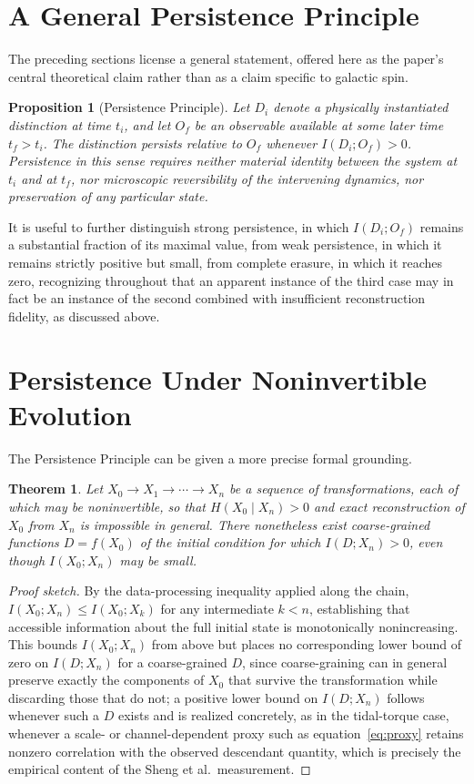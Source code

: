 \documentclass[11pt]{article}
\newtheorem{theorem}{Theorem}
\newtheorem{proposition}{Proposition}
\begin{document}
\section{A General Persistence Principle}

The preceding sections license a general statement, offered here as the paper's central theoretical claim rather than as a claim specific to galactic spin.

\begin{proposition}[Persistence Principle]
Let $D_i$ denote a physically instantiated distinction at time $t_i$, and let $O_f$ be an observable available at some later time $t_f > t_i$. The distinction persists relative to $O_f$ whenever $I(D_i; O_f) > 0$. Persistence in this sense requires neither material identity between the system at $t_i$ and at $t_f$, nor microscopic reversibility of the intervening dynamics, nor preservation of any particular state.
\end{proposition}

It is useful to further distinguish strong persistence, in which $I(D_i; O_f)$ remains a substantial fraction of its maximal value, from weak persistence, in which it remains strictly positive but small, from complete erasure, in which it reaches zero, recognizing throughout that an apparent instance of the third case may in fact be an instance of the second combined with insufficient reconstruction fidelity, as discussed above.

\section{Persistence Under Noninvertible Evolution}

The Persistence Principle can be given a more precise formal grounding.

\begin{theorem}
Let $X_0 \to X_1 \to \cdots \to X_n$ be a sequence of transformations, each of which may be noninvertible, so that $H(X_0 \mid X_n) > 0$ and exact reconstruction of $X_0$ from $X_n$ is impossible in general. There nonetheless exist coarse-grained functions $D = f(X_0)$ of the initial condition for which $I(D; X_n) > 0$, even though $I(X_0; X_n)$ may be small.
\end{theorem}

\begin{proof}[Proof sketch]
By the data-processing inequality applied along the chain, $I(X_0; X_n) \leq I(X_0; X_k)$ for any intermediate $k < n$, establishing that accessible information about the full initial state is monotonically nonincreasing. This bounds $I(X_0; X_n)$ from above but places no corresponding lower bound of zero on $I(D; X_n)$ for a coarse-grained $D$, since coarse-graining can in general preserve exactly the components of $X_0$ that survive the transformation while discarding those that do not; a positive lower bound on $I(D; X_n)$ follows whenever such a $D$ exists and is realized concretely, as in the tidal-torque case, whenever a scale- or channel-dependent proxy such as equation~\eqref{eq:proxy} retains nonzero correlation with the observed descendant quantity, which is precisely the empirical content of the Sheng et al.\ measurement.
\end{proof}
\end{document}
